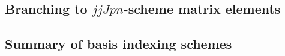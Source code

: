 \documentclass[aps,groupedaddress,onecolumn,11pt,floatfix]{revtex4}
\begin{document}
\subsection{Branching to $jjJpn$-scheme matrix elements}

\subsection{Summary of basis indexing schemes}








\end{document}
